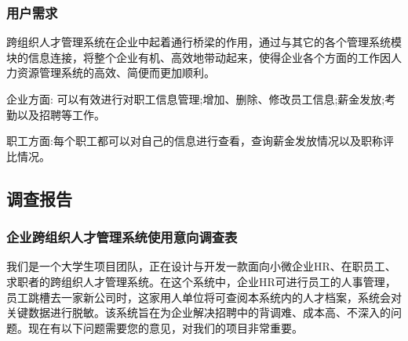 \documentclass[UTF8]{ctexart}
\begin{document}
\subsubsection{用户需求}
跨组织人才管理系统在企业中起着通行桥梁的作用，通过与其它的各个管理系统模块的信息连接，将整个企业有机、高效地带动起来，使得企业各个方面的工作因人力资源管理系统的高效、简便而更加顺利。

企业方面: 可以有效进行对职工信息管理;增加、删除、修改员工信息;薪金发放;考勤以及招聘等工作。

职工方面:每个职工都可以对自己的信息进行查看，查询薪金发放情况以及职称评比情况。

\subsection{调查报告}
\subsubsection{企业跨组织人才管理系统使用意向调查表}
我们是一个大学生项目团队，正在设计与开发一款面向小微企业HR、在职员工、求职者的跨组织人才管理系统。在这个系统中，企业HR可进行员工的人事管理，员工跳槽去一家新公司时，这家用人单位将可查阅本系统内的人才档案，系统会对关键数据进行脱敏。该系统旨在为企业解决招聘中的背调难、成本高、不深入的问题。现在有以下问题需要您的意见，对我们的项目非常重要。
\end{document}
